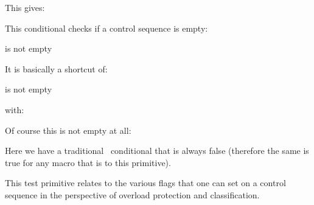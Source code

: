 \typebuffer

This gives:

{\getbuffer}

\stopnewprimitive

\startnewprimitive[title={\prm {ifempty}}]

This conditional checks if a control sequence is empty:

\starttyping
is \ifempty\MyMacro \else not \fi empty
\stoptyping

It is basically a shortcut of:

\starttyping
is \ifx\MyMacro\empty \else not \fi empty
\stoptyping

with:

\starttyping
\def\empty{}
\stoptyping

Of course this is not empty at all:

\starttyping
\def\notempty#1{}
\stoptyping

\stopnewprimitive

\startoldprimitive[title={\prm {iffalse}}]

Here we have a traditional \TEX\ conditional that is always false (therefore the
same is true for any macro that is  to this primitive).

\stopoldprimitive

\startnewprimitive[title={\prm {ifflags}}]

This test primitive relates to the various flags that one can set on a control
sequence in the perspective of overload protection and classification.

\startbuffer
\protected\untraced\tolerant{}
\permanent\constant         {}
\stopbuffer

\typebuffer

